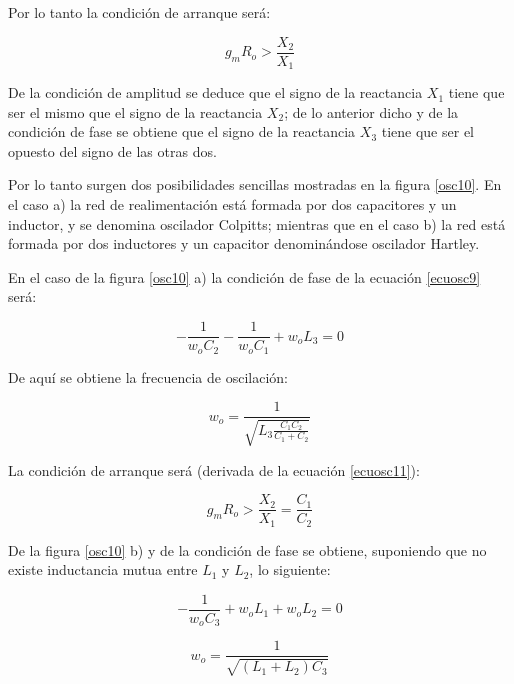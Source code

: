 Por lo tanto la condición de arranque será:

\begin{equation}\label{ecuosc11}
	g_mR_o>\frac{\displaystyle X_2}{\displaystyle X_1}
\end{equation}

De la condición de amplitud se deduce que el signo de la reactancia
$X_1$ tiene que ser el mismo que el signo de la reactancia $X_2$; de
lo anterior dicho y de la condición de fase se obtiene que el signo
de la reactancia $X_3$ tiene que ser el opuesto del signo de las
otras dos.

Por lo tanto surgen dos posibilidades sencillas mostradas en la
figura \ref{osc10}. En el caso a) la red de realimentación está
formada por dos capacitores y un inductor, y se denomina oscilador
Colpitts; mientras que en el caso b) la red está formada por dos
inductores y un capacitor denominándose oscilador Hartley.

En el caso de la figura \ref{osc10} a) la condición de fase de la
ecuación \ref{ecuosc9} será:

\begin{equation}\label{ecuosc12}
	-\frac{\displaystyle 1}{\displaystyle w_oC_2}-\frac{\displaystyle 1}{\displaystyle
		w_oC_1}+w_oL_3=0
\end{equation}

De aquí se obtiene la frecuencia de oscilación:

\begin{equation}\label{ecuosc13}
	w_o=\frac{\displaystyle 1}{\displaystyle \sqrt{L_3\frac{C_1C_2}{C_1+C_2}}}
\end{equation}

La condición de arranque será (derivada de la ecuación
\ref{ecuosc11}):

\begin{equation}\label{ecuosc14}
	g_mR_o>\frac{\displaystyle X_2}{\displaystyle X_1}=\frac{\displaystyle C_1}{\displaystyle C_2}
\end{equation}

De la figura \ref{osc10} b) y de la condición de fase se obtiene,
suponiendo que no existe inductancia mutua entre $L_1$ y $L_2$, lo
siguiente:

\begin{equation}\label{ecuosc15}
	-\frac{\displaystyle 1}{\displaystyle w_oC_3}+w_oL_1+w_oL_2=0
\end{equation}

\begin{equation}\label{ecuosc16}
	w_o=\frac{\displaystyle 1}{\displaystyle \sqrt{(L_1+L_2)C_3}}
\end{equation}

